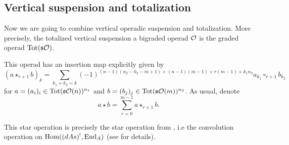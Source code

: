 \documentclass[join.tex]{subfiles}
\begin{document}
\subsection{Vertical suspension and totalization} 

Now we are going to combine vertical operadic suspension and totalization. More precisely, the totalized vertical suspension a bigraded operad ${\mathcal O}$ is the graded operad $\mathrm{Tot}(\mathfrak{s}{\mathcal O})$. 


This operad has an insertion map explicitly given by
\begin{equation}\label{star}
(a\star_{r+1} b)_k=\sum_{k_1+k_2=k}(-1)^{(n-1)(n_2-k_2-m+1)+(n-1)(m-1)+r(m-1)+k_1n_2}a_{k_1}\circ_{r+1}b_{k_2}
\end{equation}
for $a=(a_i)_i\in \mathrm{Tot}(\mathfrak{s}{\mathcal O}(n))^{n_1}$ and $b=(b_j)_j\in \mathrm{Tot}(\mathfrak{s}{\mathcal O}(m))^{n_2}$. As usual, denote \[a\star b=\sum_{r=0}^{m-1}a\star_{r+1}b.\]

This star operation is precisely the star operation from \cite[\S 5.1]{LRW}, i.e the convolution operation on $\operatorname{Hom}((dAs)^{!}, \operatorname{End}_A)$ (see \cite{LRW} for details). 

\end{document}
